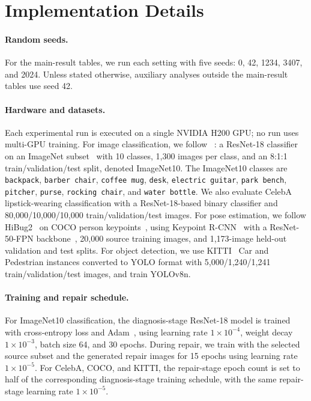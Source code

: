 \section{Implementation Details}
\label{app:implementation-details}

\paragraph{Random seeds.}
For the main-result tables, we run each setting with five seeds: 0, 42, 1234, 3407, and 2024. Unless stated otherwise, auxiliary analyses outside the main-result tables use seed 42.

\paragraph{Hardware and datasets.}

Each experimental run is executed on a single NVIDIA H200 GPU; no run uses multi-GPU training. For image classification, we follow \safefix~\citep{xu2025safefix}: a ResNet-18 classifier~\citep{he2016deep} on an ImageNet subset~\citep{deng2009imagenet} with 10 classes, 1,300 images per class, and an 8:1:1 train/validation/test split, denoted ImageNet10. The ImageNet10 classes are \texttt{backpack}, \texttt{barber chair}, \texttt{coffee mug}, \texttt{desk}, \texttt{electric guitar}, \texttt{park bench}, \texttt{pitcher}, \texttt{purse}, \texttt{rocking chair}, and \texttt{water bottle}. We also evaluate CelebA~\citep{liu2015deep} lipstick-wearing classification with a ResNet-18-based binary classifier and 80,000/10,000/10,000 train/validation/test images. For pose estimation, we follow HiBug2~\citep{chen2025hibug2} on COCO person keypoints~\citep{lin2014microsoft}, using Keypoint R-CNN~\citep{mask-rcnn-2017} with a ResNet-50-FPN backbone~\citep{he2016deep}, 20,000 source training images, and 1,173-image held-out validation and test splits. For object detection, we use KITTI~\citep{geiger2012we} Car and Pedestrian instances converted to YOLO format with 5,000/1,240/1,241 train/validation/test images, and train YOLOv8n.
\paragraph{Training and repair schedule.}
For ImageNet10 classification, the diagnosis-stage ResNet-18 model is trained with cross-entropy loss and Adam~\citep{kingma2015adam}, using learning rate $1\times10^{-4}$, weight decay $1\times10^{-3}$, batch size 64, and 30 epochs. During repair, we train with the selected source subset and the generated repair images for 15 epochs using learning rate $1\times10^{-5}$. For CelebA, COCO, and KITTI, the repair-stage epoch count is set to half of the corresponding diagnosis-stage training schedule, with the same repair-stage learning rate $1\times10^{-5}$.

